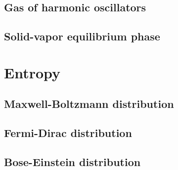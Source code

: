 \section{Gas of harmonic oscillators}
\section{Solid-vapor equilibrium phase}

\chapter{Entropy}
\section{Maxwell-Boltzmann distribution}
\section{Fermi-Dirac distribution}
\section{Bose-Einstein distribution}

    